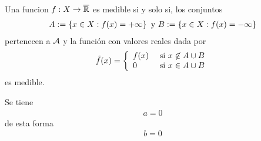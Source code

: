 \documentclass[../main.tex]{subfiles}
\begin{document}
    Una funcion $f: X \rightarrow \overline{ \mathbb{R} }$ es medible si y solo si, los conjuntos
        \begin{align}
            A := \left\lbrace x \in X : f(x) = + \infty \right\rbrace \text{ y } B := \left\lbrace x \in X : f(x) = - \infty \right\rbrace
        \end{align}
    pertenecen a $\mathcal{A}$ y la función con valores reales dada por
        \begin{align}
            \tilde{f}(x) = \left\{ 
                \begin{array}{ll} 
                    f(x) & \text{ si } x \not\in A \cup B \\ 
                    0 & \text{ si } x \in A \cup B 
                \end{array} \right.
        \end{align}
    es medible.
    
    \begin{demostracion}
        Se tiene
            \begin{align}
                a = 0
            \end{align}
        de esta forma
            \begin{align}
                b = 0
            \end{align}

    \end{demostracion}
\end{document}
